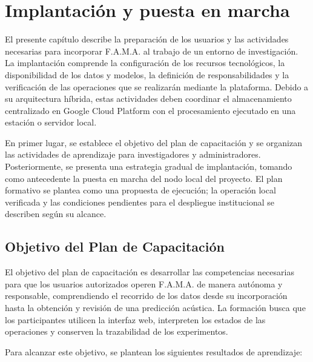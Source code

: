 \chapter{Implantación y puesta en marcha}
\label{cap:implantacion-puesta-marcha}

El presente capítulo describe la preparación de los usuarios y las actividades
necesarias para incorporar F.A.M.A. al trabajo de un entorno de investigación.
La implantación comprende la configuración de los recursos tecnológicos, la
disponibilidad de los datos y modelos, la definición de responsabilidades y la
verificación de las operaciones que se realizarán mediante la plataforma.
Debido a su arquitectura híbrida, estas actividades deben coordinar el
almacenamiento centralizado en Google Cloud Platform con el procesamiento
ejecutado en una estación o servidor local.

En primer lugar, se establece el objetivo del plan de capacitación y se
organizan las actividades de aprendizaje para investigadores y administradores.
Posteriormente, se presenta una estrategia gradual de implantación, tomando
como antecedente la puesta en marcha del nodo local del proyecto. El plan
formativo se plantea como una propuesta de ejecución; la operación local
verificada y las condiciones pendientes para el despliegue institucional se
describen según su alcance.

\section{Objetivo del Plan de Capacitación}
\label{sec:objetivo-capacitacion}

El objetivo del plan de capacitación es desarrollar las competencias necesarias
para que los usuarios autorizados operen F.A.M.A. de manera autónoma y
responsable, comprendiendo el recorrido de los datos desde su incorporación
hasta la obtención y revisión de una predicción acústica. La formación busca
que los participantes utilicen la interfaz web, interpreten los estados de las
operaciones y conserven la trazabilidad de los experimentos.

Para alcanzar este objetivo, se plantean los siguientes resultados de
aprendizaje:

